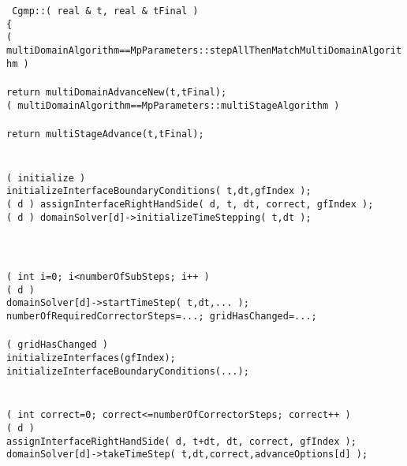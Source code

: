 \begin{flushleft}\tt\small
Cgmp::( real \& t, real \& tFinal ) \\
\{  \\
\ia   \IF( multiDomainAlgorithm==MpParameters::stepAllThenMatchMultiDomainAlgorithm ) \\
\ib     {} \\
\ib     return multiDomainAdvanceNew(t,tFinal); \\
\ia   \ELSEIF(  multiDomainAlgorithm==MpParameters::multiStageAlgorithm ) \\
\ib     {} \\
\ib     return multiStageAdvance(t,tFinal); \\
\ia   \END \\
\ia \\ 
\ia  \IF( initialize ) \\
\ib    initializeInterfaceBoundaryConditions( t,dt,gfIndex );\\
\ib    \ForDomain( d ) assignInterfaceRightHandSide( d, t, dt, correct, gfIndex );\\
\ib    \ForDomain( d ) domainSolver[d]->initializeTimeStepping( t,dt );\\
\ia  \END \\
\ia \\
\ia  {}\\
\ia  \FOR( int i=0; i<numberOfSubSteps; i++ )\\
\ib    \ForDomain( d )\\
\ic      domainSolver[d]->startTimeStep( t,dt,... );\\
\ic      numberOfRequiredCorrectorSteps=...; gridHasChanged=...; \\ 
\ib    \END \\
\ib    \IF( gridHasChanged ) \\
\ic     initializeInterfaces(gfIndex); initializeInterfaceBoundaryConditions(...); \\
\ib    \END \\
\ib \\
\ib    \FOR( int correct=0; correct<=numberOfCorrectorSteps; correct++ ) \\
\ic       \ForDomain( d )\\
\id        assignInterfaceRightHandSide( d, t+dt, dt, correct, gfIndex );  \\
\id        domainSolver[d]->takeTimeStep( t,dt,correct,advanceOptions[d] );  \\

\end{flushleft}
